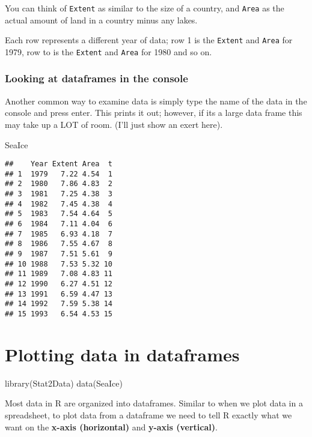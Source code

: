 \documentclass[
]{book}
\newenvironment{Shaded}{\begin{snugshade}}{\end{snugshade}}
\newcommand{\FunctionTok}[1]{\textcolor[rgb]{0.00,0.00,0.00}{#1}}
\newcommand{\NormalTok}[1]{#1}
\begin{document}
You can think of \texttt{Extent} as similar to the size of a country, and \texttt{Area} as the actual amount of land in a country minus any lakes.

Each row represents a different year of data; row 1 is the \texttt{Extent} and \texttt{Area} for 1979, row to is the \texttt{Extent} and \texttt{Area} for 1980 and so on.

\hypertarget{looking-at-dataframes-in-the-console}{%
\subsection{Looking at dataframes in the console}\label{looking-at-dataframes-in-the-console}}

Another common way to examine data is simply type the name of the data in the console and press enter. This prints it out; however, if its a large data frame this may take up a LOT of room. (I'll just show an exert here).

\begin{Shaded}
\begin{Highlighting}[]
\NormalTok{SeaIce}
\end{Highlighting}
\end{Shaded}

\begin{verbatim}
##    Year Extent Area  t
## 1  1979   7.22 4.54  1
## 2  1980   7.86 4.83  2
## 3  1981   7.25 4.38  3
## 4  1982   7.45 4.38  4
## 5  1983   7.54 4.64  5
## 6  1984   7.11 4.04  6
## 7  1985   6.93 4.18  7
## 8  1986   7.55 4.67  8
## 9  1987   7.51 5.61  9
## 10 1988   7.53 5.32 10
## 11 1989   7.08 4.83 11
## 12 1990   6.27 4.51 12
## 13 1991   6.59 4.47 13
## 14 1992   7.59 5.38 14
## 15 1993   6.54 4.53 15
\end{verbatim}

\hypertarget{plotting-data-in-dataframes}{%
\chapter{Plotting data in dataframes}\label{plotting-data-in-dataframes}}

\begin{Shaded}
\begin{Highlighting}[]
\FunctionTok{library}\NormalTok{(Stat2Data)}
\FunctionTok{data}\NormalTok{(SeaIce)}
\end{Highlighting}
\end{Shaded}

Most data in R are organized into dataframes. Similar to when we plot data in a spreadsheet, to plot data from a dataframe we need to tell R exactly what we want on the \textbf{x-axis (horizontal)} and \textbf{y-axis (vertical)}.
\end{document}
